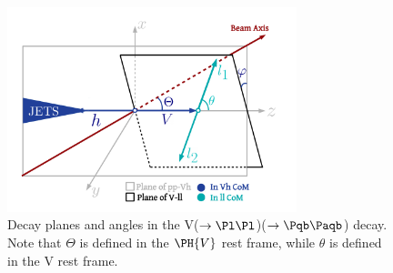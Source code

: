 \documentclass[a4paper,11pt]{article}
\newcommand{\Pb}{{{\Pqb}}\xspace}
\newcommand{\PAb}{{{{\Paqb}}}\xspace}
\renewcommand{\PV}{{{{V}}}\xspace}
\begin{document}
\begin{figure}[hbtp]
\begin{center}
\includegraphics[width=0.75\textwidth]{Figures/LHE/TheThreeAnglesVh.pdf}
\end{center}
\caption{
Decay planes and angles in the \PV($\to \Pl \Pl$)\PH($\to \Pb \PAb$) decay. Note that $\Theta$ is defined in the $\PH\PV$ rest frame, while $\theta$ is defined in the \PV rest frame.
}
\label{fig:HelicityFrame}
\end{figure}
\end{document}
